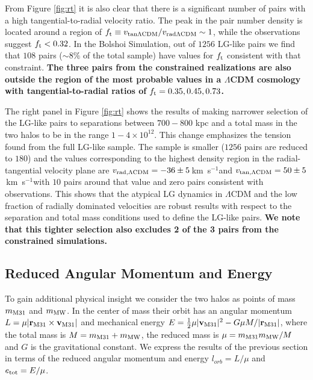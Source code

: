 \documentclass{emulateapj}
\newcommand{\kms}{\,km~s$^{-1}$}
\newcommand{\Msun}{{\ifmmode{{\rm {M_{\odot}}}}\else{${\rm{M_{\odot}}}$}\fi}}
\begin{document}
From Figure \ref{fig:rt} it is also clear that there is a significant number of pairs with a high tangential-to-radial velocity ratio. The peak in the pair number density is located around a region of $f_{\rm t}\equiv v_{\rm tan \Lambda CDM}/v_{\rm rad \Lambda CDM}\sim 1$, while the observations suggest $f_{\rm t}<0.32$. In the Bolshoi Simulation, out of $1256$ LG-like pairs we find that $108$ pairs ($\sim 8\%$ of the total sample) have values for $f_{\rm t}$ consistent with that constraint. {\bf The three pairs from the constrained realizations are also outside the region of the most probable values in a $\Lambda$CDM cosmology with tangential-to-radial ratios of $f_{\rm t}= 0.35, 0.45, 0.73$.}

The right panel in Figure \ref{fig:rt} shows the results of making narrower selection of the LG-like pairs to separations between $700-800$ kpc and a total mass in the two halos to be in the range $1-4 \times 10^{12}$\Msun. This change emphasizes the tension found from the full LG-like sample. The sample is smaller ($1256$ pairs are reduced to $180$) and the values corresponding to the highest density region in the radial-tangential velocity plane are  $v_{\rm rad,\Lambda CDM} = -36\pm 5$\kms and $v_{\rm tan,\Lambda CDM} = 50\pm5$\kms with $10$ pairs around that value and zero pairs consistent with observations. This shows that the atypical LG dynamics in $\Lambda$CDM and the low fraction of radially dominated velocities are robust results with respect to the separation and total mass conditions used to define the LG-like pairs. {\bf We note that this tighter selection also excludes 2 of the 3 pairs from the constrained simulations.}


\subsection{Reduced Angular Momentum and Energy}


To gain additional physical insight we consider the two halos as points of mass $m_{\rm M31}$ and $m_{\rm MW}$. In the center of mass their orbit has an angular momentum $L=\mu|{{\bf r}_{\rm M31}}\times{\bf v}_{\rm M31}|$ and mechanical energy $E=\frac{1}{2}\mu |{\bf v}_{\rm M31}|^2 - G\mu M/|{\bf r}_{\rm M31}|$, where the total mass is $M=m_{\rm M31}+m_{\rm MW}$, the reduced mass is $\mu=m_{\rm M31}m_{\rm MW}/M$ and $G$ is the gravitational constant. We express the results of the previous section in terms of the reduced angular momentum and energy $l_{orb}=L/\mu$ and $e_{\rm tot}=E/\mu$. 
\end{document}
